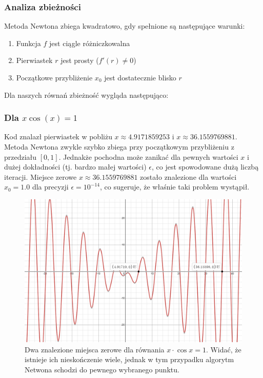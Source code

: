 \documentclass[a4paper,12pt]{article}
\begin{document}
    \subsubsection{Analiza zbieżności}
    
    Metoda Newtona zbiega kwadratowo, gdy spełnione są następujące warunki:
    \begin{enumerate}
        \item Funkcja $f$ jest ciągle różniczkowalna
        \item Pierwiastek $r$ jest prosty ($f'(r) \neq 0$)
        \item Początkowe przybliżenie $x_0$ jest dostatecznie blisko $r$
    \end{enumerate}
    
    Dla naszych równań zbieżność wygląda następująco:
    
    \subsubsection{Dla $x \cos(x) = 1$}
    Kod znalazł pierwiastek w pobliżu $x \approx 4.9171859253$ i  $x \approx 36.1559769881$. Metoda Newtona zwykle szybko zbiega przy początkowym przybliżeniu z przedziału $[0, 1]$. Jednakże pochodna może zanikać dla pewnych wartości $x$ i dużej dokładności (tj. bardzo małej wartości) $\epsilon$, co jest spowodowane dużą liczbą iteracji. Miejsce zerowe $x \approx 36.1559769881$ zostało znalezione dla wartości $x_0 = 1.0$ dla precyzji $\epsilon = 10^{-14}$, co sugeruje, że właśnie taki problem wystąpił.
    
    \begin{figure}[H]
        \centering
        \includegraphics[width=1\linewidth]{found_points.PNG}
        \caption{Dwa znalezione miejsca zerowe dla równania $x \cdot \cos x = 1$. Widać, że istnieje ich nieskończenie wiele, jednak w tym przypadku algorytm Netwona schodzi do pewnego wybranego punktu.}
        \label{fig:first-solutions}
    \end{figure}
    
\end{document}
